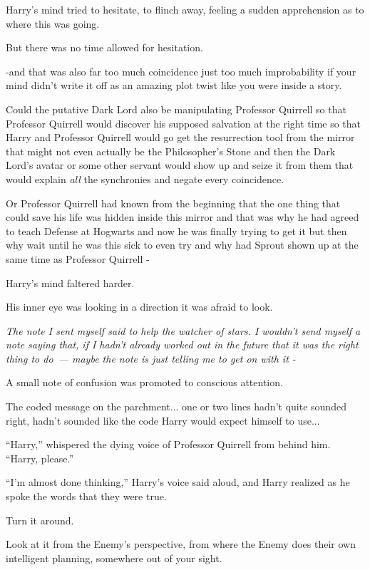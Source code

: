 Harry's mind tried to hesitate, to flinch away, feeling a sudden apprehension as to where this was going.

But there was no time allowed for hesitation.

-and that was also far too much coincidence just too much improbability if your mind didn't write it off as an amazing plot twist like you were inside a story.

Could the putative Dark Lord also be manipulating Professor Quirrell so that Professor Quirrell would discover his supposed salvation at the right time so that Harry and Professor Quirrell would go get the resurrection tool from the mirror that might not even actually be the Philosopher's Stone and then the Dark Lord's avatar or some other servant would show up and seize it from them that would explain \emph{all} the synchronies and negate every coincidence.

Or Professor Quirrell had known from the beginning that the one thing that could save his life was hidden inside this mirror and that was why he had agreed to teach Defense at Hogwarts and now he was finally trying to get it but then why wait until he was this sick to even try and why had Sprout shown up at the same time as Professor Quirrell -

Harry's mind faltered harder.

His inner eye was looking in a direction it was afraid to look.

\emph{The note I sent myself said to help the watcher of stars. I wouldn't send myself a note saying that, if I hadn't already worked out in the future that it was the right thing to do~--- maybe the note is just telling me to get on with it -}

A small note of confusion was promoted to conscious attention.

The coded message on the parchment... one or two lines hadn't quite sounded right, hadn't sounded like the code Harry would expect himself to use...

``Harry,'' whispered the dying voice of Professor Quirrell from behind him. ``Harry, please.''

``I'm almost done thinking,'' Harry's voice said aloud, and Harry realized as he spoke the words that they were true.

Turn it around.

Look at it from the Enemy's perspective, from where the Enemy does their own intelligent planning, somewhere out of your sight.

